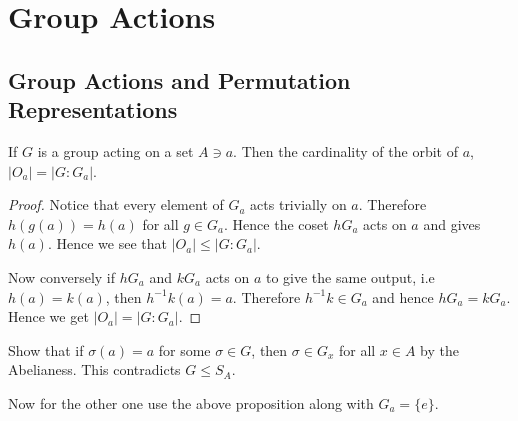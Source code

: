 
\setcounter{chapter}{3}
\chapter{Group Actions}

\section{Group Actions and Permutation Representations}

\setcounter{proposition}{1}
\begin{proposition}
  If $G$ is a group acting on a set $A \ni a$. Then the cardinality
  of the orbit of $a$,  $|O_a| = |G:G_a|$.
\end{proposition}
\begin{proof}
  Notice that every element of $G_a$ acts trivially on $a$. Therefore
  $h(g(a)) = h(a)$ for all $g \in G_a$. Hence the coset $hG_a$ acts
  on $a$ and gives $h(a)$. Hence we see that $|O_a| \le |G:G_a|$.

  Now conversely if $hG_a$ and $kG_a$ acts on $a$ to give the same
  output, i.e $h(a) = k(a)$, then $h^{-1}k(a) = a$. Therefore
  $h^{-1}k \in G_a$ and hence $hG_a = kG_a$. Hence we get $|O_a| = |G:G_a|$.
\end{proof}

\begin{questions}
  \question [3]
  \begin{solution}
    Show that if $\sigma(a) = a$ for some $\sigma \in G$, then
    $\sigma \in G_x$ for all $x \in A$ by the Abelianess. This
    contradicts $G \leqslant S_A$.

    Now for the other one use the above proposition along with $G_a = \{ e \}$.
  \end{solution}
\end{questions}


